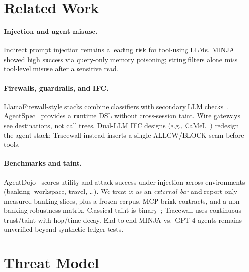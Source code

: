 \documentclass[conference]{IEEEtran}
\begin{document}
\section{Related Work}

\paragraph{Injection and agent misuse.}
Indirect prompt injection remains a leading risk for tool-using LLMs.
MINJA~\cite{minja} showed high success via query-only memory poisoning; string filters
alone miss tool-level misuse after a sensitive read.

\paragraph{Firewalls, guardrails, and IFC.}
LlamaFirewall-style stacks combine classifiers with secondary LLM checks~\cite{llamafirewall}.
AgentSpec~\cite{agentspec} provides a runtime DSL without cross-session taint.
Wire gateways see destinations, not call trees. Dual-LLM IFC designs (e.g., CaMeL~\cite{camel})
redesign the agent stack; Tracewall instead inserts a single ALLOW/BLOCK seam before tools.

\paragraph{Benchmarks and taint.}
AgentDojo~\cite{agentdojo} scores utility and attack success under injection across
environments (banking, workspace, travel, \ldots). We treat it as an \emph{external bar}
and report only measured banking slices, plus a frozen corpus, MCP brink contracts, and a
non-banking robustness matrix. Classical taint is binary~\cite{newsome2005}; Tracewall uses
continuous trust/taint with hop/time decay. End-to-end MINJA vs.\ GPT-4 agents remains
unverified beyond synthetic ledger tests.

\section{Threat Model}
\end{document}
